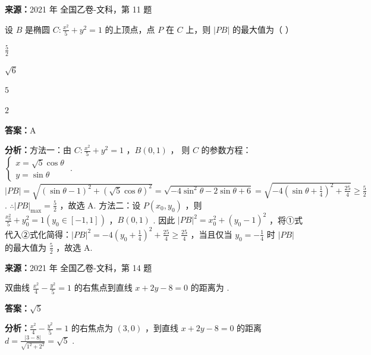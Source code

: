 \begin{question}[points=5]
\textbf{来源：}2021 年 全国乙卷-文科，第 11 题\par
设 $B$ 是椭圆 $C: \frac{x^2}{5} + y^2 = 1$ 的上顶点，点 $P$ 在 $C$ 上，则 $|PB|$ 的最大值为（ ）
\begin{choices}
  \item $\frac{5}{2}$
  \item $\sqrt{6}$
  \item $5$
  \item $2$
\end{choices}
\begin{solution}
\textbf{答案：}A

\textbf{分析：}方法一：由 $C: \frac{x^2}{5} + y^2 = 1$ ，$B(0,1)$ ，
则 $C$ 的参数方程：$\begin{cases} x = \sqrt{5}\cos\theta \\ y = \sin\theta \end{cases}$ .
$|PB| = \sqrt{(\sin\theta - 1)^2 + (\sqrt{5}\cos\theta)^2} = \sqrt{-4\sin^2\theta - 2\sin\theta + 6} = \sqrt{-4(\sin\theta + \frac{1}{4})^2 + \frac{25}{4}} \ge \frac{5}{2}$ .
$\therefore |PB|_{\max} = \frac{5}{2}$ ，故选 A.
方法二：设 $P(x_0,y_0)$ ，则 $\frac{x_0^2}{5} + y_0^2 = 1 (y_0 \in [-1,1])$ ，$B(0,1)$ .
因此 $|PB|^2 = x_0^2 + (y_0 - 1)^2$ ，将①式代入②式化简得：$|PB|^2 = -4(y_0 + \frac{1}{4})^2 + \frac{25}{4} \ge \frac{25}{4}$ ，当且仅当 $y_0 = -\frac{1}{4}$ 时 $|PB|$ 的最大值为 $\frac{5}{2}$ ，故选 A.
\end{solution}
\end{question}

\begin{question}[points=5]
\textbf{来源：}2021 年 全国乙卷-文科，第 14 题\par
双曲线 $\frac{x^2}{4} - \frac{y^2}{5} = 1$ 的右焦点到直线 $x + 2y - 8 = 0$ 的距离为 .
\fillin[{$\sqrt{5}$}]
\begin{solution}
\textbf{答案：}$\sqrt{5}$

\textbf{分析：}$\frac{x^2}{4} - \frac{y^2}{5} = 1$ 的右焦点为 $(3,0)$ ，到直线 $x + 2y - 8 = 0$ 的距离 $d = \frac{|3-8|}{\sqrt{1^2+2^2}} = \sqrt{5}$ .
\end{solution}
\end{question}

